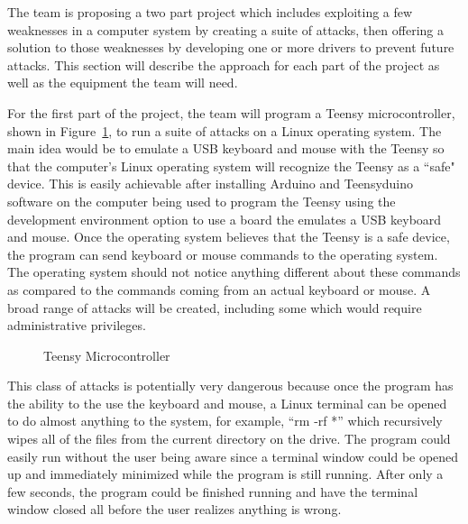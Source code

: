 \documentclass[pagenumbers]{ieee}
\begin{document}
The team is proposing a two part project which includes exploiting a few weaknesses in a computer system by creating a suite of attacks, then offering a solution to those weaknesses by developing one or more drivers to prevent future attacks. This section will describe the approach for each part of the project as well as the equipment the team will need.

For the first part of the project, the team will program a Teensy microcontroller, shown in Figure~\ref{fig:Teensy}, to run a suite of attacks on a Linux operating system. The main idea would be to emulate a USB keyboard and mouse with the Teensy so that the computer's Linux operating system will recognize the Teensy as a ``safe" device. This is easily achievable after installing Arduino and Teensyduino software on the computer being used to program the Teensy using the development environment option to use a board the emulates a USB keyboard and mouse. Once the operating system believes that the Teensy is a safe device, the program can send keyboard or mouse commands to the operating system. The operating system should not notice anything different about these commands as compared to the commands coming from an actual keyboard or mouse. A broad range of attacks will be created, including some which would require administrative privileges.

\begin{figure}[H]
   \caption{Teensy Microcontroller}
   \label{fig:Teensy}
\end{figure}

This class of attacks is potentially very dangerous because once the program has the ability to the use the keyboard and mouse, a Linux terminal can be opened to do almost anything to the system, for example, ``rm -rf *'' which recursively wipes all of the files from the current directory on the drive. The program could easily run without the user being aware since a terminal window could be opened up and immediately minimized while the program is still running. After only a few seconds, the program could be finished running and have the terminal window closed all before the user realizes anything is wrong.
\end{document}
